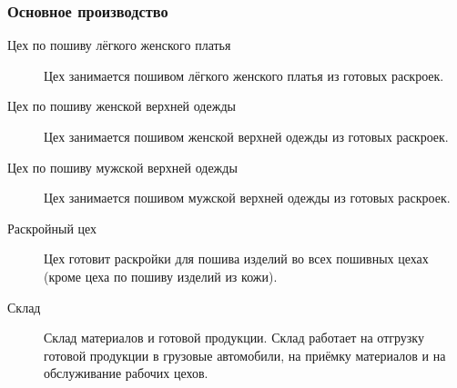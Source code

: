 \subsubsection{Основное производство}
\begin{description}
\item [Цех по пошиву лёгкого женского платья]
  Цех занимается пошивом лёгкого женского платья из готовых раскроек.
\item [Цех по пошиву женской верхней одежды]
  Цех занимается пошивом женской верхней одежды из готовых раскроек.
\item [Цех по пошиву мужской верхней одежды]
  Цех занимается пошивом мужской верхней одежды из готовых раскроек.
\item [Раскройный цех]
  Цех готовит раскройки для пошива изделий во всех пошивных цехах (кроме цеха по пошиву изделий из кожи).
\item [Склад]
  Склад материалов и готовой продукции. Склад работает на отгрузку готовой продукции в грузовые автомобили, на приёмку материалов и на обслуживание рабочих цехов.
\end{description}
